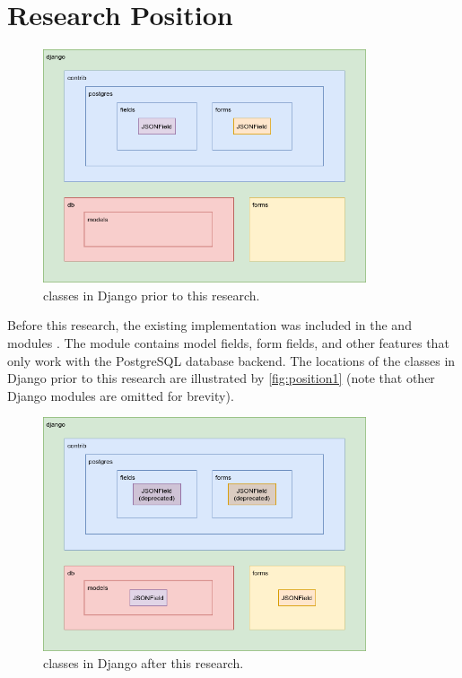 \section{Research Position}

\begin{figure}
	\centering
    \includegraphics[width=0.85\textwidth]{pics/position1.png}
	\caption{ classes in Django prior to this research.}
	\label{fig:position1}
\end{figure}

Before this research, the existing  implementation was included
in the  and
 modules \cite{django30_modeljsonfield,
django30_formjsonfield}. The  module contains
model fields, form fields, and other features that only work with the
PostgreSQL database backend. The locations of the  classes in
Django prior to this research are illustrated by \autoref{fig:position1} (note
that other Django modules are omitted for brevity).

\begin{figure}
	\centering
    \includegraphics[width=0.85\textwidth]{pics/position2.png}
	\caption{ classes in Django after this research.}
	\label{fig:position2}
\end{figure}

